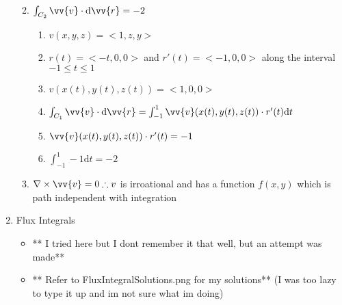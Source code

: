 \documentclass{article}
\begin{document}
\begin{enumerate}
\begin{enumerate}
\begin{enumerate}
        \end{enumerate}
        \item $\int_{C_2}^{} \vv{v} \cdot \mathrm{d} \vv{r}  = -2$
        \begin{enumerate}
            \item $v(x,y,z) = <1,z,y>$
            \item $r(t) = <-t,0,0>$ and $r'(t) = <-1,0,0>$ along the interval $ -1 \leq t \leq 1 $
            \item $v(x(t),y(t),z(t)) = <1, 0, 0>$
            \item $\int_{C_1}^{} \vv{v} \cdot \mathrm{d} \vv{r} = \int_{-1}^{1} \vv{v}(x(t),y(t),z(t)) \cdot r'(t) \mathrm{d} t$
            \item $\vv{v}(x(t),y(t),z(t)) \cdot r'(t) = -1$
            \item $\int_{-1}^{1} -1 \mathrm{d}t = -2 $
        \end{enumerate}
        \item $\nabla \times \vv{v} = 0 \therefore v$ is irroational and has a function $f(x,y)$ which is path independent with integration 
    \end{enumerate}
    \item Flux Integrals
    \begin{itemize}
        \item ** I tried here but I dont remember it that well, but an attempt was made**
        \item ** Refer to FluxIntegralSolutions.png for my solutions** (I was too lazy to type it up and im not sure what im doing)
    \end{itemize}
\end{enumerate}
\end{document}
